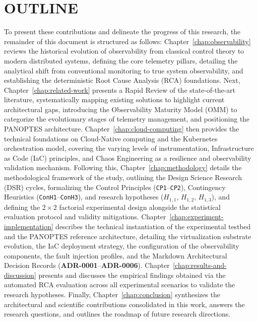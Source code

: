 \section{OUTLINE}
\label{sec:outline}

To present these contributions and delineate the progress of this research, the remainder of this document is structured as follows: Chapter~\ref{chap:observability} reviews the historical evolution of observability from classical control theory to modern distributed systems, defining the core telemetry pillars, detailing the analytical shift from conventional monitoring to true system observability, and establishing the deterministic Root Cause Analysis (RCA) foundations. Next, Chapter~\ref{chap:related-work} presents a Rapid Review of the state-of-the-art literature, systematically mapping existing solutions to highlight current architectural gaps, introducing the Observability Maturity Model (OMM) to categorize the evolutionary stages of telemetry management, and positioning the PANOPTES architecture. Chapter~\ref{chap:cloud-computing} then provides the technical foundations on Cloud-Native computing and the Kubernetes orchestration model, covering the varying levels of instrumentation, Infrastructure as Code (IaC) principles, and Chaos Engineering as a resilience and observability validation mechanism. Following this, Chapter~\ref{chap:methodology} details the methodological framework of the study, outlining the Design Science Research (DSR) cycles, formalizing the Control Principles (\texttt{CP1}--\texttt{CP2}), Contingency Heuristics (\texttt{ConH1}--\texttt{ConH3}), and research hypotheses ($H_{1,1}$, $H_{1,2}$, $H_{1,3}$), and defining the $2\times2$ factorial experimental design alongside the statistical evaluation protocol and validity mitigations. Chapter~\ref{chap:experiment-implementation} describes the technical instantiation of the experimental testbed and the PANOPTES reference architecture, detailing the virtualization substrate evolution, the IaC deployment strategy, the configuration of the observability components, the fault injection profiles, and the Markdown Architectural Decision Records (\textbf{ADR-0001}--\textbf{ADR-0006}). Chapter~\ref{chap:results-and-discussion} presents and discusses the empirical findings obtained via the automated RCA evaluation across all experimental scenarios to validate the research hypotheses. Finally, Chapter~\ref{chap:conclusion} synthesizes the architectural and scientific contributions consolidated in this work, answers the research questions, and outlines the roadmap of future research directions.